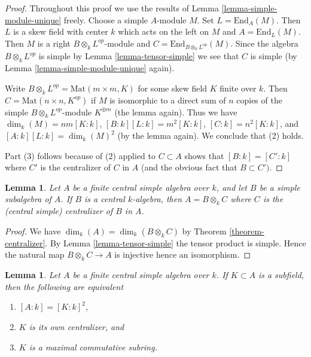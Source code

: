 \documentclass{stacks-project}
\theoremstyle{plain}
\newtheorem{lemma}[subsection]{Lemma}
\theoremstyle{definition}
\theoremstyle{remark}
\numberwithin{equation}{subsection}
\begin{document}
\begin{proof}
Throughout this proof we use the results of
Lemma \ref{lemma-simple-module-unique} freely.
Choose a simple $A$-module $M$. Set $L = \text{End}_A(M)$.
Then $L$ is a skew field with center $k$ which acts on the left on $M$
and $A = \text{End}_L(M)$.
Then $M$ is a right $B \otimes_k L^{op}$-module and
$C = \text{End}_{B \otimes_k L^{op}}(M)$.
Since the algebra $B \otimes_k L^{op}$ is simple by
Lemma \ref{lemma-tensor-simple} we see that $C$ is simple (by
Lemma \ref{lemma-simple-module-unique} again).

\medskip\noindent
Write $B \otimes_k L^{op} = \text{Mat}(m \times m, K)$ for some
skew field $K$ finite over $k$. Then $C = \text{Mat}(n \times n, K^{op})$
if $M$ is isomorphic to a direct sum of $n$ copies of the simple
$B \otimes_k L^{op}$-module $K^{\oplus m}$ (the lemma again). Thus we have
$\dim_k(M) = nm [K : k]$, $[B : k] [L : k] = m^2 [K : k]$,
$[C : k] = n^2 [K : k]$, and $[A : k] [L : k] = \dim_k(M)^2$ (by
the lemma again). We conclude that (2) holds.

\medskip\noindent
Part (3) follows because of (2) applied to $C \subset A$ shows
that $[B : k] = [C' : k]$ where $C'$ is the centralizer of $C$ in $A$
(and the obvious fact that $B \subset C')$.
\end{proof}

\begin{lemma}
\label{lemma-when-tensor-is-equal}
Let $A$ be a finite central simple algebra over $k$, and let
$B$ be a simple subalgebra of $A$. If $B$ is a central
$k$-algebra, then $A = B \otimes_k C$ where $C$ is the (central simple)
centralizer of $B$ in $A$.
\end{lemma}

\begin{proof}
We have $\dim_k(A) = \dim_k(B \otimes_k C)$ by
Theorem \ref{theorem-centralizer}. By
Lemma \ref{lemma-tensor-simple}
the tensor product is simple. Hence the natural map
$B \otimes_k C \to A$ is injective hence an isomorphism.
\end{proof}

\begin{lemma}
\label{lemma-self-centralizing-subfield}
Let $A$ be a finite central simple algebra over $k$.
If $K \subset A$ is a subfield, then the following are equivalent
\begin{enumerate}
\item $[A : k] = [K : k]^2$,
\item $K$ is its own centralizer, and
\item $K$ is a maximal commutative subring.
\end{enumerate}
\end{lemma}
\end{document}
